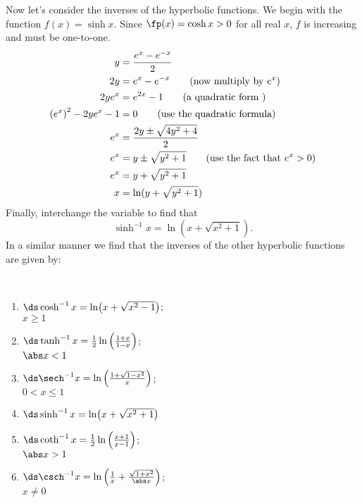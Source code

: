 Now let's consider the inverses of the hyperbolic functions. We begin with the function $f(x)=\sinh x$. Since $\fp(x)=\cosh x>0$ for all real $x$, $f$ is increasing and must be one-to-one.
\begin{align*}\allowdisplaybreaks
y&=\frac{e^x-e^{-x}}2\\
2y&=e^x-e^{-x} \qquad\text{(now multiply by $e^x$)}\\
2ye^x&=e^{2x}-1 \qquad\text{(a quadratic form )}\\
\left(e^x\right)^2-2ye^x-1&=0 \qquad\text{(use the quadratic formula)}\\
e^x&=\frac{2y\pm\sqrt{4y^2+4}}2\\
e^x&=y\pm\sqrt{y^2+1} \qquad\text{(use the fact that $e^x>0$)}\\
e^x&=y+\sqrt{y^2+1}\\
x&=\ln(y+\sqrt{y^2+1})\\
\end{align*}
Finally, interchange the variable to find that
\[\sinh^{-1} x=\ln(x+\sqrt{x^2+1}).\]
In a similar manner we find that the inverses of the other hyperbolic functions are given by:

{
\begin{keyidea}\label{idea:hyperbolic_log}%
\mbox{}\\[-2\baselineskip]%
%
\begin{multicols}{2}
\begin{enumerate}
\item $\ds\cosh^{-1}x=\ln\bigl(x+\sqrt{x^2-1}\bigr)$;\\\null\qquad $x\geq1$
\item $\ds\tanh^{-1}x=\frac12\ln\left(\frac{1+x}{1-x}\right)$;\\\null\qquad$\abs x<1$
\item $\ds\sech^{-1}x=\ln\left(\frac{1+\sqrt{1-x^2}}x\right)$;\\\null\qquad$0<x\leq1$
\item $\ds\sinh^{-1}x=\ln\bigl(x+\sqrt{x^2+1}\bigr)$\\\mbox{}
\item $\ds\coth^{-1}x=\frac12\ln\left(\frac{x+1}{x-1}\right)$;\\\null\qquad$\abs x>1$
\item $\ds\csch^{-1}x=\ln\left(\frac1x+\frac{\sqrt{1+x^2}}{\abs x}\right)$;\\\null\qquad $x\neq0$
\end{enumerate}
\end{multicols}
\end{keyidea}
}

